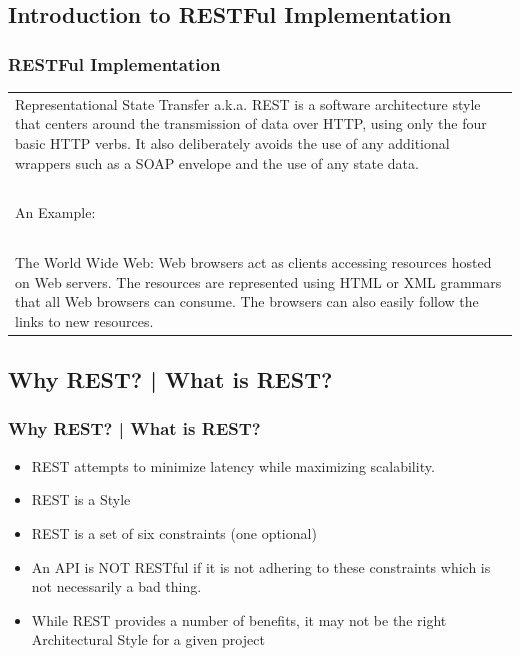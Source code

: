 \documentclass{beamer}
\begin{document}
\subsection{Introduction to RESTFul Implementation} 
\begin{frame}
\frametitle{RESTFul Implementation}
\begin{tabular}{@{\hspace{2ex}}p{30em}}
Representational State Transfer a.k.a. REST is a software architecture style that centers around the transmission of data over HTTP, using only the four basic HTTP verbs. It also deliberately avoids the use of any additional wrappers such as a SOAP envelope and the use of any state data.\\~\\
An Example:\\~\\The World Wide Web: Web browsers act as clients accessing resources hosted on Web servers. The resources are represented using HTML or XML grammars that all Web browsers can consume. The browsers can also easily follow the links to new resources.
\end{tabular}
\end{frame}

\subsection{Why REST? | What is REST?}

\begin{frame}
\frametitle{Why REST? | What is REST?}
\begin{itemize}
\item REST attempts to minimize latency while maximizing scalability.
\item REST is a Style
\item REST is a set of six constraints (one optional)
\item An API is NOT RESTful if it is not adhering to these constraints which is not necessarily a bad thing.
\item While REST provides a number of benefits, it may not be the right Architectural Style for a given project

\end{itemize}
\end{frame}

\end{document}

